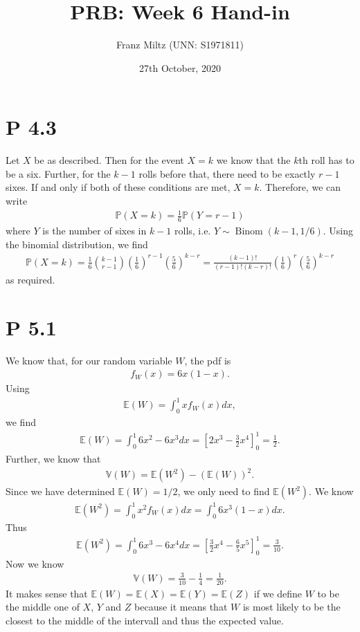 \documentclass{article}
\renewcommand{\P}{\mathbb{P}}
\newcommand{\E}{\mathbb{E}}
\newcommand{\V}{\mathbb{V}}
\DeclareMathOperator{\Binom}{Binom}
\begin{document}
\title{PRB: Week 6 Hand-in}
\author{Franz Miltz (UNN: S1971811)}
\date{27th October, 2020}
\maketitle
\section*{P 4.3}
Let $X$ be as described. Then for the event $X=k$ we know that
the $k$th roll has to be a six. Further, for the $k-1$ rolls before
that, there need to be exactly $r-1$ sixes. If and only if both of these
conditions are met, $X=k$. Therefore, we can write
\begin{align*}
  \P(X=k) = \frac{1}{6}\P(Y=r-1)
\end{align*}
where $Y$ is the number of sixes in $k-1$ rolls, i.e. $Y\sim\Binom(k-1,1/6)$. Using the binomial
distribution, we find
\begin{align*}
  \P(X=k) = \frac{1}{6}\binom{k-1}{r-1}\left(\frac{1}{6}\right)^ {r-1}
  \left(\frac{5}{6}\right)^{k-r}
  = \frac{(k-1)!}{(r-1)!(k-r)!}\left(\frac{1}{6}\right)^r\left(\frac{5}{6}\right)^{k-r}
\end{align*}
as required.
\section*{P 5.1}
We know that, for our random variable $W$, the pdf is
\begin{align*}
  f_W(x) = 6x(1-x).
\end{align*}
Using
\begin{align*}
  \E(W) = \int_0^1 xf_W(x) dx,
\end{align*}
we find
\begin{align*}
  \E(W)=\int_0^1 6x^2-6x^3 dx = \left[2x^3 - \frac{3}{2}x^4\right]^1_0 = \frac{1}{2}.
\end{align*}
Further, we know that
\begin{align*}
  \V(W) = \E(W^2) - (\E(W))^2.
\end{align*}
Since we have determined $\E(W)=1/2$, we only need to find $\E(W^2)$. We know
\begin{align*}
  \E(W^2) = \int_0^1 x^2 f_{W}(x)dx = \int_0^1 6x^3(1-x)dx.
\end{align*}
Thus
\begin{align*}
  \E(W^2) = \int_0^1 6x^3-6x^4 dx = \left[\frac{3}{2} x^4 - \frac{6}{5}x^5\right]_0^1=\frac{3}{10}.
\end{align*}
Now we know
\begin{align*}
  \V(W) = \frac{3}{10}-\frac{1}{4} = \frac{1}{20}.
\end{align*}
It makes sense that $\E(W) = \E(X) = \E(Y) = \E(Z)$ if we define $W$ to be the middle one of $X$, $Y$ and $Z$ because
it means that $W$ is most likely to be the closest to the middle of the intervall and thus the expected value.\\
\end{document}
